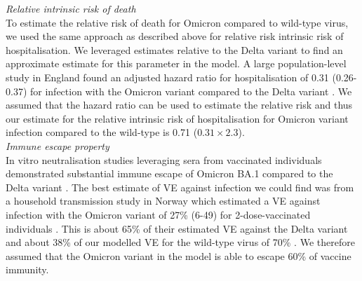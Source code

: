 \textit{Relative intrinsic risk of death}\\
To estimate the relative risk of death for Omicron compared to wild-type virus, we used the same approach as described above for relative risk intrinsic risk of hospitalisation.
We leveraged estimates relative to the Delta variant to find an approximate estimate for this parameter in the model.
A large population-level study in England found an adjusted hazard ratio for hospitalisation of 0.31 (0.26-0.37) for infection with the Omicron variant compared to the Delta variant \cite{nyberg2022}. 
We assumed that the hazard ratio can be used to estimate the relative risk and thus our estimate for the relative intrinsic risk of hospitalisation for Omicron variant infection compared to the wild-type is 0.71 ($0.31 \times 2.3$).\\

\textit{Immune escape property}\\
In vitro neutralisation studies leveraging sera from vaccinated individuals demonstrated substantial immune escape of Omicron BA.1 compared to the Delta variant \cite{willett2022}. 
The best estimate of VE against infection we could find was from a household transmission study in Norway which estimated a VE against infection with the Omicron variant of 27\% (6-49) for 2-dose-vaccinated 
individuals \cite{jalili2022}. This is about 65\% of their estimated VE against the Delta variant and about 38\% of our modelled VE for the wild-type virus of 70\% \cite{jalili2022}. We therefore assumed that 
the Omicron variant in the model is able to escape 60\% of vaccine immunity.